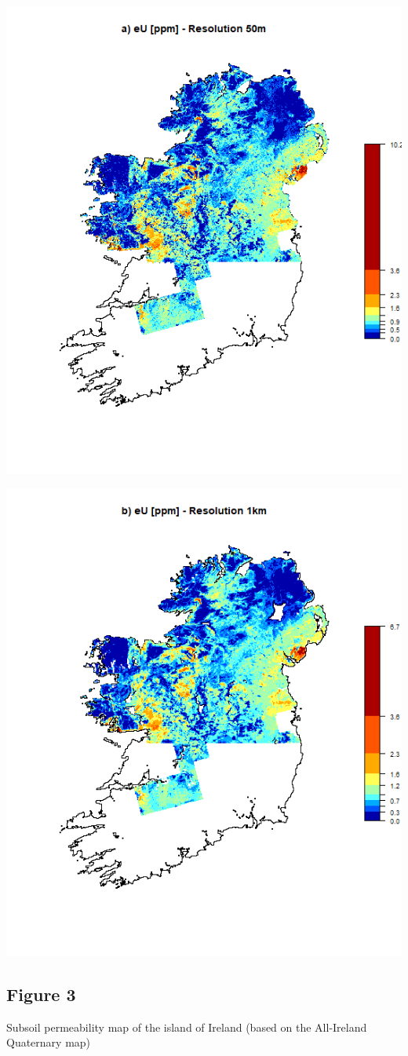 \documentclass[
  12pt,
]{article}
\begin{document}
\begin{center}\includegraphics[width=0.5\linewidth]{Rresults/Figure_2a} \end{center}

\begin{center}\includegraphics[width=0.5\linewidth]{Rresults/Figure_2b} \end{center}

\hypertarget{figure-3}{%
\subsection{Figure 3}\label{figure-3}}

Subsoil permeability map of the island of Ireland (based on the
All-Ireland Quaternary map)
\end{document}

